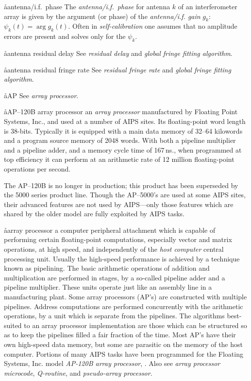 \aa{antenna/i.f.\ phase}
The {\it antenna/i.f.\ phase} for antenna $k$ of an
interferometer array is given by the argument (or phase)
of the {\it antenna/i.f. gain} $g_k$: $\psi_k(t)=\arg g_k(t)$.
Often in {\it self-calibration} one assumes that no amplitude
errors are present and solves only for the $\psi_k$.

\aa{antenna residual delay}
See {\it residual delay} and {\it global fringe fitting algorithm}.

\aa{antenna residual fringe rate}
See {\it residual fringe rate} and {\it global fringe fitting algorithm}.

\aa{AP} See {\it array processor}.

\aa{AP--120B array processor}
an {\it array processor} manufactured by Floating Point Systems, Inc.,
and used at a number of AIPS sites.
Its floating-point word length is 38-bits.
Typically it is equipped with a main data memory of 32--64
kilowords and a program source memory of 2048 words.
With both a pipeline multiplier and a pipeline adder,
and a memory cycle time of 167\,ns.,
when programmed at top efficiency it can perform
at an arithmetic rate of 12 million floating-point operations per second.
\par
The AP--120B is no longer in production; this product has been superseded
by the 5000 series product line.
Though the AP--5000's are used at some AIPS sites, their advanced
features are not used by AIPS---only those features which are shared by the
older model are fully exploited by AIPS tasks.

\aa{array processor}
a computer peripheral attachment which is capable of performing
certain floating-point computations, especially vector and matrix
operations, at high speed, and independently of the {\it host computer}
central processing unit.
Usually the high-speed performance is achieved by a technique known
as pipelining.
The basic arithmetic operations of addition and multiplication
are performed in stages, by a so-called pipeline adder and a pipeline
multiplier.
These units operate just like an assembly line in a manufacturing plant.
Some array processors (AP's) are constructed with multiple pipelines.
Address computations are performed concurrently with the arithmetic
operations, by a unit which is separate from the pipelines.
The algorithms best-suited to an array processor
implementation are those which can be structured so as to keep
the pipelines filled a fair fraction of the time.
Most AP's have their own high-speed data memory,
but some are parasitic on the memory of the host computer.
Portions of many AIPS tasks have been programmed for
the Floating Systems, Inc. model {\it AP-120B array processor}, \qv.
Also see {\it array processor microcode}, {\it Q-routine},
and {\it pseudo-array processor}.

